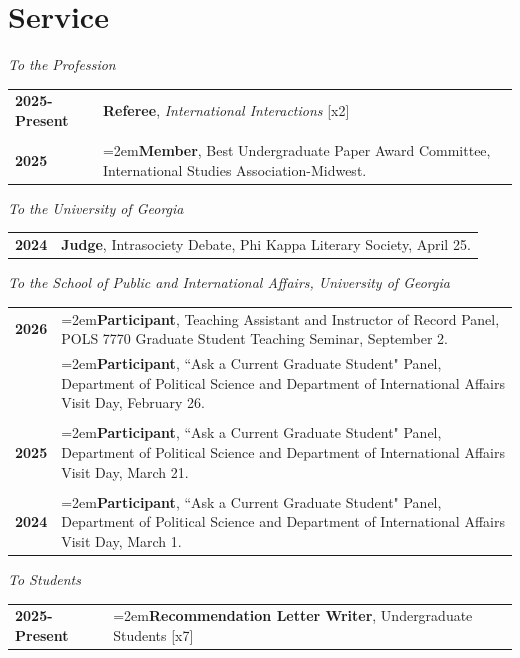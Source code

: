 \documentclass[letterpaper,12pt]{article}
\begin{document}
\section{Service}
\textit{To the Profession}
\begin{xltabular}{\dimexpr\textwidth-0in}{p{1.5in}X}
\textbf{2025-Present} 	&  \textbf{Referee}, \textit{International Interactions} [x2] \\ \\

\textbf{2025} 			&  \hangindent=2em\textbf{Member}, Best Undergraduate Paper Award Committee, International Studies Association-Midwest.
\end{xltabular}
\par
\textit{To the University of Georgia}
\begin{xltabular}{\dimexpr\textwidth-0in}{p{1.5in}X}
\textbf{2024} 			&  \textbf{Judge}, Intrasociety Debate, Phi Kappa Literary Society, April 25.
\end{xltabular}
\par
\textit{To the School of Public and International Affairs, University of Georgia}
\begin{xltabular}{\dimexpr\textwidth-0in}{p{1.5in}X}
\textbf{2026} 			&  \hangindent=2em\textbf{Participant}, Teaching Assistant and Instructor of Record Panel, POLS 7770 Graduate Student Teaching Seminar, September 2. \\
					&  \hangindent=2em\textbf{Participant}, ``Ask a Current Graduate Student" Panel, Department of Political Science and \mbox{Department} of International Affairs Visit Day, February 26. \\ \\

\textbf{2025} 			&  \hangindent=2em\textbf{Participant}, ``Ask a Current Graduate Student" Panel, Department of Political Science and \mbox{Department} of International Affairs Visit Day, March 21. \\ \\

\textbf{2024} 			&  \hangindent=2em\textbf{Participant}, ``Ask a Current Graduate Student" Panel, Department of Political Science and \mbox{Department} of International Affairs Visit Day, March 1.
\end{xltabular}
\par
\textit{To Students}
\begin{xltabular}{\dimexpr\textwidth-0in}{p{1.5in}X}
\textbf{2025-Present} 	&  \hangindent=2em\textbf{Recommendation Letter Writer}, Undergraduate Students [x7]
\end{xltabular}
\end{document}
